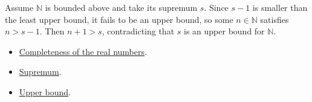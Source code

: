 \begin{remark*}
Assume $\mathbb{N}$ is bounded above and take its supremum $s$.  Since
$s-1$ is smaller than the least upper bound, it fails to be an upper bound,
so some $n\in\mathbb{N}$ satisfies $n>s-1$.  Then $n+1>s$, contradicting
that $s$ is an upper bound for $\mathbb{N}$.
\end{remark*}

\begin{dependencies}
\begin{itemize}
  \item \hyperref[ax:completeness-of-reals]{Completeness of the real numbers}.
  \item \hyperref[def:supremum]{Supremum}.
  \item \hyperref[def:upper-bound]{Upper bound}.
\end{itemize}
\end{dependencies}

\clearpage
